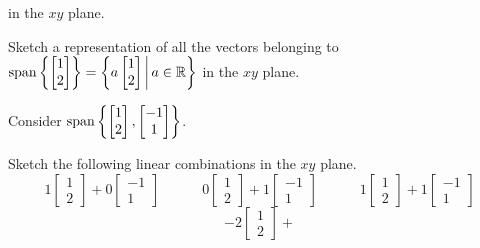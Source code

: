 \begin{applicationActivities}
\begin{activity}{10}
\begin{subactivity}
    in the \(xy\) plane.
  \end{subactivity}
  \begin{subactivity}
    Sketch a representation of all the vectors belonging to
    \(
      \operatorname{span}\left\{\begin{bmatrix}1\\2\end{bmatrix}\right\}
        =
      \left\{a\begin{bmatrix}1\\2\end{bmatrix}\,\middle|\,a\in\mathbb{R}\right\}
    \)
    in the \(xy\) plane.
  \end{subactivity}
\end{activity}





\begin{activity}{10}
  Consider \(\operatorname{span}\left\{\begin{bmatrix}1\\2\end{bmatrix},
  \begin{bmatrix}-1\\1\end{bmatrix}\right\}\).
  \begin{subactivity}
    Sketch the following linear combinations in the \(xy\) plane.
    \[
    1\begin{bmatrix}1\\2\end{bmatrix}+
    0\begin{bmatrix}-1\\1\end{bmatrix}\hspace{3em}
    0\begin{bmatrix}1\\2\end{bmatrix}+
    1\begin{bmatrix}-1\\1\end{bmatrix}\hspace{3em}
    1\begin{bmatrix}1\\2\end{bmatrix}+
    1\begin{bmatrix}-1\\1\end{bmatrix}
    \]
    \[
    -2\begin{bmatrix}1\\2\end{bmatrix}+
\]
\end{subactivity}
\end{activity}
\end{applicationActivities}
